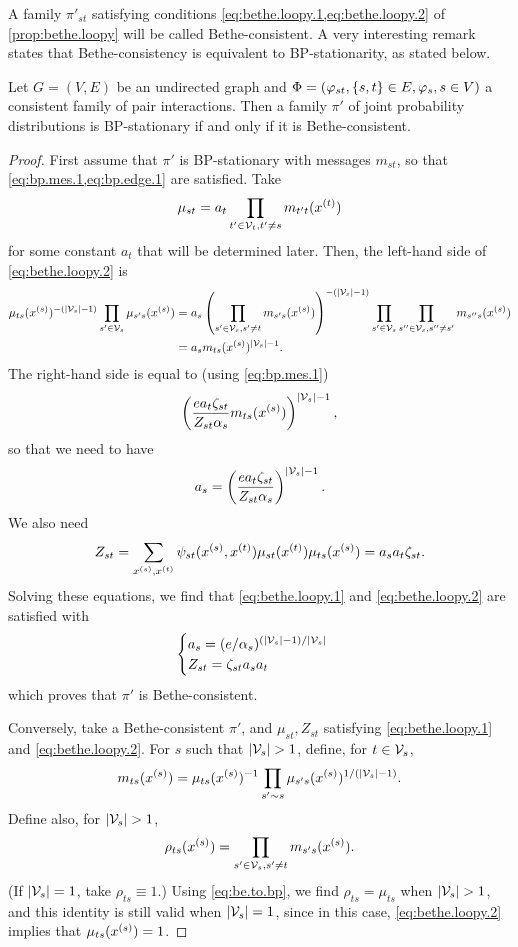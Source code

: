 A family $\pi'_{st}$ satisfying conditions \cref{eq:bethe.loopy.1,eq:bethe.loopy.2}  of 
\cref{prop:bethe.loopy} will be called Bethe-consistent. A very
interesting remark states that Bethe-consistency is
equivalent to BP-stationarity, as stated below.
\begin{proposition}
\label{prop:bp.be}
Let $G= (V,E)$ be an undirected graph and  $\Phi = (\varphi_{st},
\left\{ s,t \right\}\in E, \varphi_s, s\in V)$ a consistent family of pair
interactions.  Then a family $\pi'$ of joint probability distributions
is BP-stationary if and only if it is Bethe-consistent.
\end{proposition}
\begin{proof}
First assume that $\pi'$
is BP-stationary with messages $m_{st}$, so that \cref{eq:bp.mes.1,eq:bp.edge.1} are satisfied. Take
\[
\mu_{st} = a_{t} \prod_{t'\in {\mathcal V}_t, t'\neq s} m_{t't}(x^{(t)})
\] 
for some constant $a_{t}$ that will be determined later. Then, the
left-hand side of \cref{eq:bethe.loopy.2} is  
\begin{align*}
\mu_{ts}(x^{(s)})^{-(|{\mathcal V}_s|-1)} \prod_{s'\in{\mathcal V}_s}\mu_{s's}(x^{(s)}) &= a_s \left(\prod_{s'\in {\mathcal V}_s, s'\neq t}
  m_{s's}(x^{(s)})\right)^{-(|{\mathcal V}_s|-1)} \prod_{s'\in{\mathcal V}_s}
\prod_{s''\in{\mathcal V}_s, s''\neq s'} m_{s''s}(x^{(s)})\\
&= a_s m_{ts}(x^{(s)})^{|{\mathcal V}_s|-1}.
\end{align*}
The right-hand side is equal to (using \cref{eq:bp.mes.1})
\[
\left(\frac{e a_t \zeta_{st}}{Z_{st}\alpha_s}
  m_{ts}(x^{(s)})\right)^{|{\mathcal V}_s| -1}, 
\] 
so that we need to have
\[
a_s = \left(\frac{e a_t \zeta_{st}}{Z_{st}\alpha_s}\right)^{|{\mathcal V}_s|
  -1}.
\]
We also need 
\[
Z_{st} = \sum_{x^{(s)}, x^{(t)}} \psi_{st}(x^{(s)}, x^{(t)}) \mu_{st}(x^{(t)})
\mu_{ts}(x^{(s)}) = a_s a_t \zeta_{st}.
\]
Solving these equations, we find that \cref{eq:bethe.loopy.1} and
\cref{eq:bethe.loopy.2} are satisfied with
\[
\begin{cases}
a_s = (e/\alpha_s)^{(|{\mathcal V}_s|-1)/|{\mathcal V}_s|}\\
Z_{st} = \zeta_{st} a_s a_t
\end{cases}
\]
which proves that $\pi'$ is Bethe-consistent.


Conversely, take a Bethe-consistent $\pi'$, and $\mu_{st}, Z_{st}$
satisfying \cref{eq:bethe.loopy.1} and
\cref{eq:bethe.loopy.2}. For $s$ such that $|{\mathcal V}_s| > 1$, define, for $t\in{\mathcal V}_s$,
\begin{equation}
\label{eq:be.to.bp}
m_{ts}(x^{(s)}) = \mu_{ts}(x^{(s)})^{-1} \prod_{s'\sim s}
\mu_{s's}(x^{(s)})^{1/(|{\mathcal V}_s|-1)}.
\end{equation}
Define also, for $|{\mathcal V}_s| > 1$,
\[
\rho_{ts}(x^{(s)}) = \prod_{s'\in {\mathcal V}_s, s'\neq t} m_{s's}(x^{(s)}).
\]
(If $|{\mathcal V}_s| = 1$, take $\rho_{ts} \equiv 1$.)
Using \cref{eq:be.to.bp}, we find
$\rho_{ts} = \mu_{ts}$ when $|{\mathcal V}_s| > 1$, and this identity is still valid when $|{\mathcal V}_s| =1$, since in this case,
\cref{eq:bethe.loopy.2} implies that $\mu_{ts}(x^{(s)}) = 1$. 


\end{proof}
